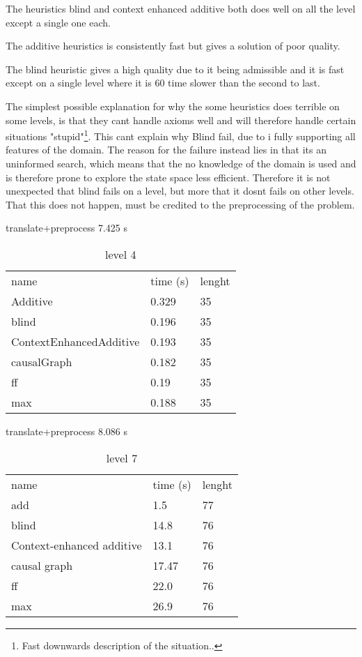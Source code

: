 The heuristics blind and context enhanced additive both does well on all the level except a single one each. 

The additive heuristics is consistently fast but gives a solution of poor quality.

The blind heuristic gives a high quality due to it being admissible and it is fast except on a single level where it is 60 time slower than the second to last.

The simplest possible explanation for why the some heuristics does terrible on some levels, is that they cant handle axioms well and will therefore handle certain situations "stupid"\footnote{Fast downwards description of the situation..}. This cant explain why Blind fail, due to i fully supporting all features of the domain. The reason for the failure instead lies in that its an uninformed search, which means that the no knowledge of the domain is used and is therefore prone to explore the state space less efficient. Therefore it is not unexpected that blind fails on a level, but more that it dosnt fails on other levels. That this does not happen, must be credited to the preprocessing of the problem.






%
%

	\begin{table}[h]
		\centering
		\caption{level 4}
		\label{tablvl4}
		translate+preprocess
		7.425 s\\
		\begin{tabular}{lll}
			name & time (s)& lenght\\
			Additive & 0.329 & 35\\
			blind & 0.196 & 35\\
			ContextEnhancedAdditive & 0.193 & 35\\
			causalGraph & 0.182 & 35\\
			ff & 0.19 & 35\\
			max & 0.188 & 35\\
		\end{tabular}
	\end{table}
	
	\begin{table}[h]
		\centering
		\caption{level 7}
		\label{tablvl7}
		translate+preprocess
		8.086 s\\
		\begin{tabular}{lll}
			
			name & time (s)& lenght\\
			add & 1.5 & 77\\
			blind & 14.8 & 76\\
			Context-enhanced additive & 13.1 & 76\\
			causal graph & 17.47 & 76\\
			ff & 22.0 & 76\\
			max & 26.9 & 76\\
		\end{tabular}
	\end{table}
	
